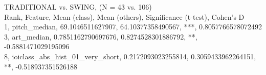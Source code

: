 TRADITIONAL vs. SWING, (N = 43 vs. 106)\\
Rank, Feature, Mean (class), Mean (others), Significance (t-test), Cohen's D\\
1, pitch_median, 69.1046511627907, 64.10377358490567, ***, 0.8057766578072492\\
3, art_median, 0.7851162790697676, 0.8274528301886792, **, -0.5881471029195096\\
8, ioiclass_abs_hist_01_very_short, 0.2172093023255814, 0.3059433962264151, **, -0.518937351526188\\
